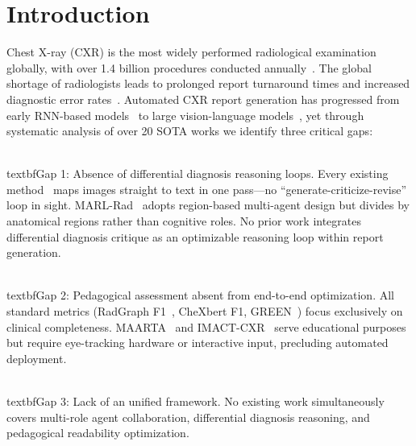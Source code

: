 \documentclass[runningheads,10pt]{llncs}
\begin{document}
\section{Introduction}

Chest X-ray (CXR) is the most widely performed radiological examination globally, with over 1.4 billion procedures conducted annually~\cite{chexagent}. The global shortage of radiologists leads to prolonged report turnaround times and increased diagnostic error rates~\cite{tanno2023}. Automated CXR report generation has progressed from early RNN-based models~\cite{r2gen} to large vision-language models~\cite{radialog,chexagent,cxrmate2}, yet through systematic analysis of over 20 SOTA works we identify three critical gaps:

\\textbf{Gap 1: Absence of differential diagnosis reasoning loops.} Every existing method~\cite{r2gen,chexagent,riha,cxrmate2} maps images straight to text in one pass---no ``generate-criticize-revise'' loop in sight. MARL-Rad~\cite{marlrad} adopts region-based multi-agent design but divides by anatomical regions rather than cognitive roles. No prior work integrates differential diagnosis critique as an optimizable reasoning loop within report generation.

\\textbf{Gap 2: Pedagogical assessment absent from end-to-end optimization.} All standard metrics (RadGraph F1~\cite{radgraph}, CheXbert F1, GREEN~\cite{green}) focus exclusively on clinical completeness. MAARTA~\cite{maarta} and IMACT-CXR~\cite{imactcxr} serve educational purposes but require eye-tracking hardware or interactive input, precluding automated deployment.

\\textbf{Gap 3: Lack of an unified framework.} No existing work simultaneously covers multi-role agent collaboration, differential diagnosis reasoning, and pedagogical readability optimization.
\end{document}
